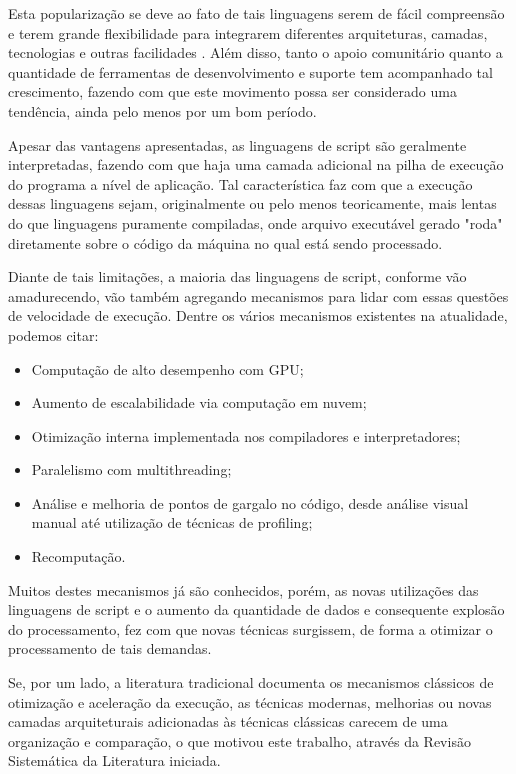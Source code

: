 \documentclass[sigconf]{acmart}
\begin{document}
Esta popularização se deve ao fato de tais linguagens serem de fácil compreensão e terem grande flexibilidade para integrarem diferentes arquiteturas, camadas, tecnologias e outras facilidades \cite{ousterhout1998scripting}. Além disso, tanto o apoio comunitário quanto a quantidade de ferramentas de desenvolvimento e suporte tem acompanhado tal crescimento, fazendo com que este movimento possa ser considerado uma tendência, ainda pelo menos por um bom período.

Apesar das vantagens apresentadas, as linguagens de script são geralmente interpretadas, fazendo com que haja uma camada adicional na pilha de execução do programa a nível de aplicação. Tal característica faz com que a execução dessas linguagens sejam, originalmente ou pelo menos teoricamente, mais lentas do que linguagens puramente compiladas, onde arquivo executável gerado "roda" diretamente sobre o código da máquina no qual está sendo processado.

Diante de tais limitações, a maioria das linguagens de script, conforme vão amadurecendo, vão também agregando mecanismos para lidar com essas questões de velocidade de execução. Dentre os vários mecanismos existentes na atualidade, podemos citar:
\begin{itemize}
\item Computação de alto desempenho com GPU;
\item Aumento de escalabilidade via computação em nuvem;
\item Otimização interna implementada nos compiladores e interpretadores;
\item Paralelismo com multithreading;
\item Análise e melhoria de pontos de gargalo no código, desde análise visual manual até utilização de técnicas de profiling;
\item Recomputação.
\end{itemize}

Muitos destes mecanismos já são conhecidos, porém, as novas utilizações das linguagens de script e o aumento da quantidade de dados e consequente explosão do processamento, fez com que novas técnicas surgissem, de forma a otimizar o processamento de tais demandas.

Se, por um lado, a literatura tradicional documenta os mecanismos clássicos de otimização e aceleração da execução, as técnicas modernas, melhorias ou novas camadas arquiteturais adicionadas às técnicas clássicas carecem de uma organização e comparação, o que motivou este trabalho, através da Revisão Sistemática da Literatura iniciada.
\end{document}
